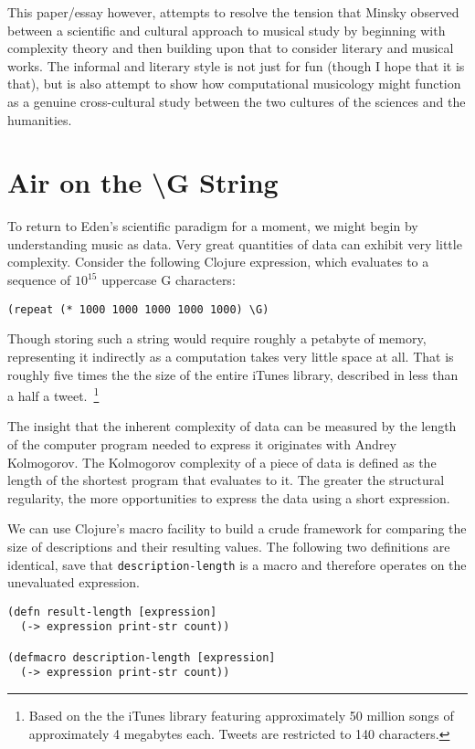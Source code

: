 \documentclass[numbers]{sigplanconf}
\begin{document}
This paper/essay however, attempts to resolve the tension that Minsky observed between a scientific and cultural approach to
musical study by beginning with complexity theory and then building upon that to consider literary and musical works. The
informal and literary style is not just for fun (though I hope that it is that), but is also attempt to show how computational
musicology might function as a genuine cross-cultural study between the two cultures of the sciences and the humanities.

\section{Air on the {\textbackslash}G String}
To return to Eden's scientific paradigm for a moment, we might begin by understanding music as data.
Very great quantities of data can exhibit very little complexity. Consider the following Clojure expression, which
evaluates to a sequence of $10^{15}$ uppercase G characters:

\begin{verbatim}
(repeat (* 1000 1000 1000 1000 1000) \G)
\end{verbatim}

Though storing such a string would require roughly a petabyte of memory, representing it indirectly as a computation
takes very little space at all. That is roughly five times the the size of the entire iTunes library,
described in less than a half a tweet.~\footnote{Based on the the iTunes library featuring approximately 50 million songs
of approximately 4 megabytes each. Tweets are restricted to 140 characters.}

The insight that the inherent complexity of data can be measured by the length of the computer program needed to express it
originates with Andrey Kolmogorov\cite{On Tables of Random Numbers}. The Kolmogorov complexity of a piece of data is defined
as the length of the shortest program that evaluates to it. The greater the structural regularity, the more opportunities
to express the data using a short expression.

We can use Clojure's macro facility to build a crude framework for comparing the size of descriptions and their
resulting values. The following two definitions are identical, save that \verb|description-length| is a macro and therefore
operates on the unevaluated expression.

\begin{verbatim}
(defn result-length [expression]
  (-> expression print-str count))

(defmacro description-length [expression]
  (-> expression print-str count))
\end{verbatim}
\end{document}

